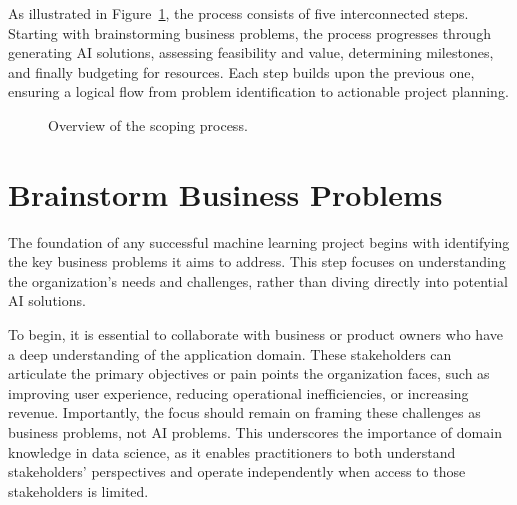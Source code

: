 \documentclass[12pt,openany, draft]{book}
\begin{document}
As illustrated in Figure~\ref{fig:scoping_process}, the process consists of five interconnected steps. Starting with brainstorming business problems, the process progresses through generating AI solutions, assessing feasibility and value, determining milestones, and finally budgeting for resources. Each step builds upon the previous one, ensuring a logical flow from problem identification to actionable project planning. 


\begin{figure}[htbp]
\centering
{}
\caption{Overview of the scoping process.}
\label{fig:scoping_process}
\end{figure}


\section{Brainstorm Business Problems}

The foundation of any successful machine learning project begins with identifying the key business problems it aims to address. This step focuses on understanding the organization's needs and challenges, rather than diving directly into potential AI solutions.
\newline

To begin, it is essential to collaborate with business or product owners who have a deep understanding of the application domain. These stakeholders can articulate the primary objectives or pain points the organization faces, such as improving user experience, reducing operational inefficiencies, or increasing revenue. Importantly, the focus should remain on framing these challenges as business problems, not AI problems. This underscores the importance of domain knowledge in data science, as it enables practitioners to both understand stakeholders' perspectives and operate independently when access to those stakeholders is limited.
\newline
\end{document}
